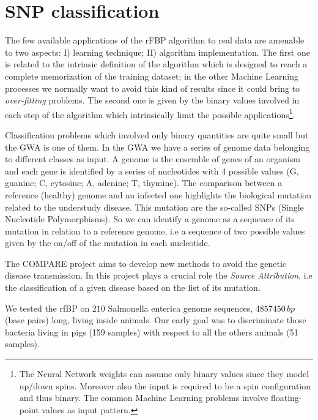 \documentclass{standalone}
\begin{document}
\section[Compare dataset]{SNP classification}\label{snp}

The few available applications of the rFBP algorithm to real data are amenable to two aspects: I) learning technique; II) algorithm implementation.
The first one is related to the intrinsic definition of the algorithm which is designed to reach a complete memorization of the training dataset; in the other Machine Learning processes we normally want to avoid this kind of results since it could bring to \emph{over-fitting} problems.
The second one is given by the binary values involved in each step of the algorithm which intrinsically limit the possible applications\footnote{
  The Neural Network weights can assume only binary values since they model up/down spins.
  Moreover also the input is required to be a spin configuration and thus binary.
  The common Machine Learning problems involve floating-point values as input pattern.
}.


Classification problems which involved only binary quantities are quite small but the GWA is one of them.
In the GWA we have a series of genome data belonging to different classes as input.
A genome is the ensemble of genes of an organism and each gene is identified by a series of nucleotides with 4 possible values (G, guanine; C, cytosine; A, adenine; T, thymine).
The comparison between a reference (healthy) genome and an infected one highlights the biological mutation related to the understudy disease.
This mutation are the so-called SNPs (Single Nucleotide Polymorphisms).
So we can identify a genome as a sequence of its mutation in relation to a reference genome, i.e a sequence of two possible values given by the on/off of the mutation in each nucleotide.

The COMPARE project aims to develop new methods to avoid the genetic disease transmission.
In this project plays a crucial role the \emph{Source Attribution}, i.e the classification of a given disease based on the list of its mutation.

We tested the rfBP on $210$ Salmonella enterica genome sequences, $4857450\,bp$ (base pairs) long, living inside animals.
Our early goal was to discriminate those bacteria living in pigs (159 samples) with respect to all the others animals (51 samples).
\end{document}
